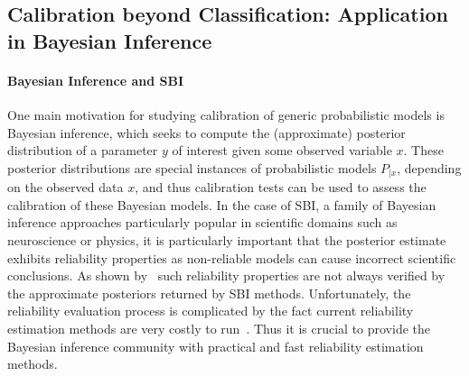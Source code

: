 \documentclass{uai2023} %
\begin{document}


\subsection{Calibration beyond Classification: Application in Bayesian Inference}

\paragraph{Bayesian Inference and SBI}
One main motivation for studying calibration of generic probabilistic models is Bayesian inference,
which seeks to compute the (approximate) posterior distribution of a parameter $y$ of interest given some observed variable $x$.
These posterior distributions are special instances of probabilistic models $P_{|x}$, depending on the observed data $x$, and thus calibration tests can be used to assess the calibration of these Bayesian models.
In the case of SBI, a family of Bayesian inference approaches particularly popular in
scientific domains such as neuroscience or physics, it is particularly
important that the posterior estimate exhibits reliability properties as
non-reliable models can cause incorrect scientific conclusions. As shown 
by~\citet{Hermans2021} such reliability properties are not always verified by the
approximate posteriors returned by SBI methods. Unfortunately, the reliability
evaluation process is complicated by the fact current reliability
estimation methods are very costly to run~\cite{Hermans2021}. Thus it is
crucial to provide the Bayesian inference community with practical and fast
reliability estimation methods.
\end{document}
